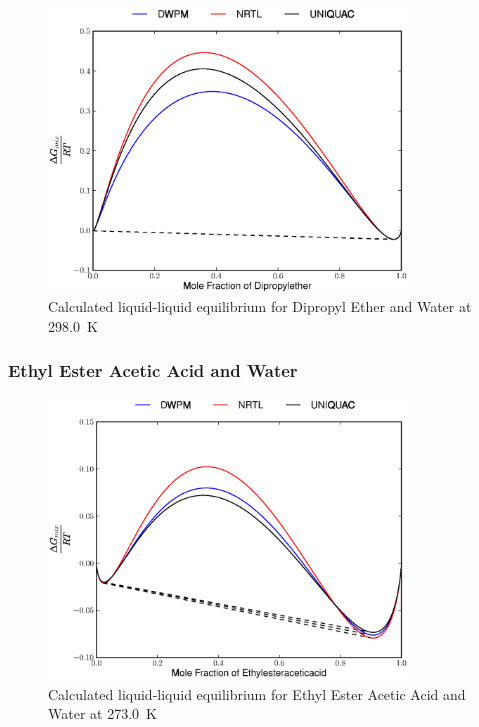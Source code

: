 \begin{figure}[hp]
\centering
\includegraphics[width = 0.85\textwidth]{Results_Parts/BinaryParams/dipropylether-water/AllModelsGibbsPlots/T_298.eps}
\caption{Calculated liquid-liquid equilibrium for Dipropyl Ether and Water at 298.0~$\mathrm{K}$}
\end{figure}

\clearpage


\subsubsection*{Ethyl Ester Acetic Acid and Water}

\begin{figure}[hp]
\centering
\includegraphics[width = 0.85\textwidth]{Results_Parts/BinaryParams/ethylesteraceticacid-water/AllModelsGibbsPlots/T_273.0.eps}
\caption{Calculated liquid-liquid equilibrium for Ethyl Ester Acetic Acid and Water at 273.0~$\mathrm{K}$} 
\end{figure}


